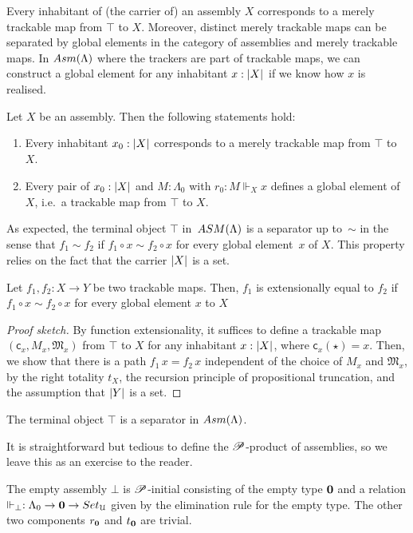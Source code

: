 \documentclass[a4paper,UKenglish,numberwithinsect,cleveref,thm-restate]{lipics-v2021}
\numberwithin{equation}{section}
\theoremstyle{plain}
\begin{document}
Every inhabitant of (the carrier of) an assembly $X$ corresponds to a merely trackable map from $\top$ to $X$.
Moreover, distinct merely trackable maps can be separated by global elements in the category of assemblies and merely trackable maps. 
In $\Asm(\Lambda)$ where the trackers are part of trackable maps, we can construct a global element for any inhabitant $x : \mathopen{}\left|X\right|_{}^{}\mathclose{}$ if we know how $x$ is realised. 
\begin{lemma}\label{lem:global-elemnt}
  Let $X$ be an assembly. Then the following statements hold:
  \begin{enumerate}
    \item Every inhabitant $x_0 : \mathopen{}\left|X\right|_{}^{}\mathclose{}$ corresponds to a merely trackable map from $\top$ to $X$.
    \item Every pair of $x_0 : \mathopen{}\left|X\right|_{}^{}\mathclose{}$ and $M : \Lambda_0$ with $r_0 : M \Vdash_X x$ defines a global element of $X$, i.e.\ a trackable map from $\top$ to $X$.
  \end{enumerate}
\end{lemma}

As expected, the terminal object $\top$ in~$\ASM(\Lambda)$ is a separator up to~$\sim$ in the sense that $f_1 \sim f_2$ if $f_1 \circ x \sim f_2 \circ x$ for every global element~$x$ of $X$.
This property relies on the fact that the carrier $\mathopen{}\left|X\right|_{}^{}\mathclose{}$ is a set.
\begin{proposition}
  Let $f_1, f_2 : X \to Y$ be two trackable maps. Then, 
  $f_1$ is extensionally equal to $f_2$ if
  $f_1 \circ x \sim f_2 \circ x$ for every global element $x$ to $X$ 
\end{proposition}
\begin{proof}[Proof sketch]
  By function extensionality, it suffices to define a trackable map $(\mathsf{c}_x, M_x, \mathfrak{M}_x)$ from $\top$ to $X$ for any inhabitant $x : \mathopen{}\left|X\right|_{}^{}\mathclose{}$, where $\mathsf{c}_x(\star) = x$.
  Then, we show that there is a path $f_1\,x = f_2\,x$ independent of the choice of $M_x$ and $\mathfrak{M}_x$, by the right totality $t_X$, the recursion principle of propositional truncation, and the assumption that $\mathopen{}\left|Y\right|_{}^{}\mathclose{}$ is a set. 
\end{proof}

\begin{corollary}
  The terminal object $\top$ is a separator in $\Asm(\Lambda)$.
\end{corollary}

It is straightforward but tedious to define the $\mathscr{P}$-product of assemblies, so we leave this as an exercise to the reader. 
\begin{example}
The empty assembly $\bot$ is $\mathscr{P}$-initial consisting of the empty type $\mathbf{0}$ and a relation $\Vdash_\bot : \Lambda_0 \to \Empty \to \setU$ given by the elimination rule for the empty type.
The other two components $r_\mathbf{0}$ and $t_\mathbf{0}$ are trivial.
\end{example}
\end{document}
